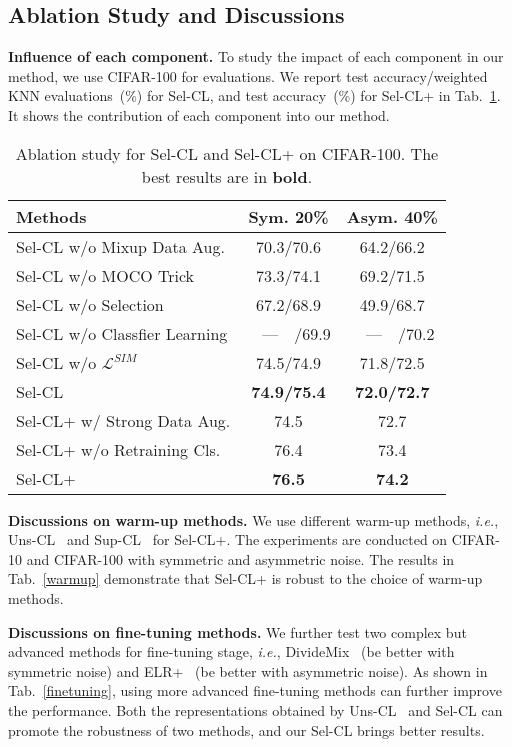 \documentclass[10pt,twocolumn,letterpaper]{article}
\newcommand{\myPara}[1]{\vspace{.05in}\noindent\textbf{#1}}
\begin{document}
\subsection{Ablation Study and Discussions} \label{sec:4.6}
\vspace{-2pt}
\myPara{Influence of each component.}
To study the impact of each component in our method, we use CIFAR-100 for evaluations. We report test accuracy/weighted KNN evaluations~(\%) for Sel-CL, and test accuracy~(\%) for Sel-CL+ in Tab.~\ref{ablation}. It shows the contribution of each component into our method. 
\begin{table}[t]		
	\caption{Ablation study for Sel-CL and Sel-CL+ on CIFAR-100. The best results are in \textbf{bold}.}\vspace{-5pt}
	\centering
	\small
	\begin{tabular}{l|c|c}
		\hline \multirow{1}{*}{Methods}  &\multicolumn{1}{c}{ Sym. 20\%} & \multicolumn{1}{|c}{Asym. 40\%} \\
		\hline
		Sel-CL w/o Mixup Data Aug. & 70.3/70.6 & 64.2/66.2  \\
		Sel-CL w/o MOCO Trick & 73.3/74.1 &  69.2/71.5 \\
		Sel-CL w/o Selection  & 67.2/68.9 & 49.9/68.7  \\		
Sel-CL w/o Classfier Learning & ~~---~~/69.9\quad & ~~---~~/70.2\quad \\		
		Sel-CL w/o $\mathcal{L}^{SIM}$  & 74.5/74.9 & 71.8/72.5  \\
		Sel-CL & \textbf{74.9/75.4} & \textbf{72.0/72.7}  \\
		\hline
		Sel-CL+ w/ Strong Data Aug. & 74.5 & 72.7  \\
		Sel-CL+ w/o Retraining Cls. & 76.4 & 73.4  \\
		Sel-CL+ & \textbf{76.5} & \textbf{74.2} \\				
		\hline
	\end{tabular}
    \label{ablation}
   \vspace{-6pt}
\end{table}

\myPara{Discussions on warm-up methods.} We use different warm-up methods, \textit{i.e.}, Uns-CL~\cite{chen2020simple} and Sup-CL~\cite{Khosla2020} for Sel-CL+. The experiments are conducted on CIFAR-10 and CIFAR-100 with symmetric and asymmetric noise. The results in Tab.~\ref{warmup} demonstrate that Sel-CL+ is robust to the choice of warm-up methods.

\myPara{Discussions on fine-tuning methods.}
We further test two complex but advanced methods for fine-tuning stage, \textit{i.e.}, DivideMix~\cite{LiSH20} (be better with symmetric noise) and ELR+~\cite{LiuNRF20} (be better with asymmetric noise). As shown in Tab.~\ref{finetuning}, using more advanced fine-tuning methods can further improve the performance. Both the representations obtained by Uns-CL~\cite{chen2020simple} and Sel-CL can promote the robustness of two methods, and our Sel-CL brings better results. 
\end{document}
